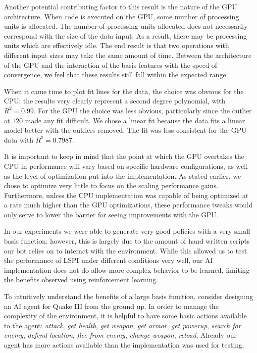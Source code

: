 Another potential contributing factor to this result is the nature of the GPU architecture. When code is executed on the GPU, some number of processing units is allocated. The number of processing units allocated does not necessarily correspond with the size of the data input. As a result, there may be processing units which are effectively idle. The end result is that two operations with different input sizes may take the same amount of time. Between the architecture of the GPU and the interaction of the basis features with the speed of convergence, we feel that these results still fall within the expected range.

When it came time to plot fit lines for the data, the choice was obvious for the CPU: the results very clearly represent a second degree polynomial, with $R^2 = 0.99$. For the GPU the choice was less obvious, particularly since the outlier at $120$ made any fit difficult. We chose a linear fit because the data fits a linear model better with the outliers removed. The fit was less consistent for the GPU data with $R^2 = 0.7987$.

It is important to keep in mind that the point at which the GPU overtakes the CPU in performance will vary based on specific hardware configurations, as well as the level of optimization put into the implementation. As stated earlier, we chose to optimize very little to focus on the scaling performance gains. Furthermore, unless the CPU implementation was capable of being optimized at a rate much higher than the GPU optimizations, these performance tweaks would only serve to lower the barrier for seeing improvements with the GPU.

In our experiments we were able to generate very good policies with a very small basis function; however, this is largely due to the amount of hand written scripts our bot relies on to interact with the environment. While this allowed us to test the performance of LSPI under different conditions very well, our AI implementation does not do allow more complex behavior to be learned, limiting the benefits observed using reinforcement learning.

To intuitively understand the benefits of a large basis function, consider designing an AI agent for Quake III from the ground up. In order to manage the complexity of the environment, it is helpful to have some basic actions available to the agent: \emph{attack}, \emph{get health}, \emph{get weapon}, \emph{get armor}, \emph{get powerup}, \emph{search for enemy}, \emph{defend location}, \emph{flee from enemy}, \emph{change weapon}, \emph{reload}. Already our agent has more actions available than the implementation was used for testing.

